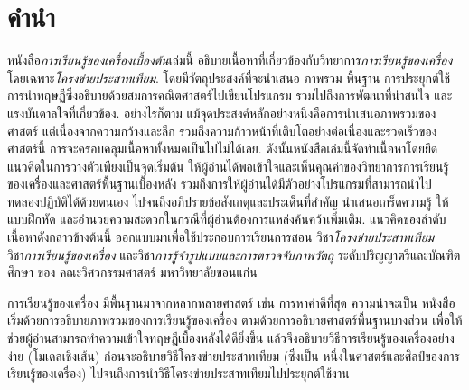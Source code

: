 \section*{คำนำ}

หนังสือ\textit{การเรียนรู้ของเครื่องเบื้องต้น}เล่มนี้ 
อธิบายเนื้อหาที่เกี่ยวข้องกับวิทยาการ\textit{การเรียนรู้ของเครื่อง} โดยเฉพาะ\textit{โครงข่ายประสาทเทียม}.
โดยมีวัตถุประสงค์ที่จะนำเสนอ ภาพรวม พื้นฐาน การประยุกต์ใช้  การนำทฤษฏีซึ่งอธิบายด้วยสมการคณิตศาสตร์ไปเขียนโปรแกรม
รวมไปถึงการพัฒนาที่น่าสนใจ และแรงบันดาลใจที่เกี่ยวข้อง.
อย่างไรก็ตาม แม้จุดประสงค์หลักอย่างหนึ่งคือการนำเสนอภาพรวมของศาสตร์
แต่เนื่องจากความกว้างและลึก
รวมถึงความก้าวหน้าที่เติบโตอย่างต่อเนื่องและรวดเร็วของศาสตร์นี้
การจะครอบคลุมเนื้อหาทั้งหมดเป็นไปไม่ได้เลย.
ดังนั้นหนังสือเล่มนี้จัดทำเนื้อหาโดยยึดแนวคิดในการวางตัวเพียงเป็นจุดเริ่มต้น
ให้ผู้อ่านได้พอเข้าใจและเห็นคุณค่าของวิทยาการการเรียนรู้ของเครื่องและศาสตร์พื้นฐานเบื้องหลัง
รวมถึงการให้ผู้อ่านได้มีตัวอย่างโปรแกรมที่สามารถนำไปทดลองปฏิบัติได้ด้วยตนเอง
ไปจนถึงอภิปรายข้อสังเกตุและประเด็นที่สำคัญ นำเสนอเกร็ดความรู้ ให้แบบฝึกหัด %
และอำนวยความสะดวกในกรณีที่ผู้อ่านต้องการแหล่งค้นคว้าเพิ่มเติม. 
แนวคิดของลำดับเนื้อหาดังกล่าวข้างต้นนี้ ออกแบบมาเพื่อใช้ประกอบการเรียนการสอน วิชา\textit{โครงข่ายประสาทเทียม} วิชา\textit{การเรียนรู้ของเครื่อง} และวิชา\textit{การรู้จำรูปแบบและการตรวจจับภาพวัตถุ} ระดับปริญญาตรีและบัณฑิตศึกษา ของ%
คณะวิศวกรรมศาสตร์ มหาวิทยาลัยขอนแก่น



การเรียนรู้ของเครื่อง มีพื้นฐานมาจากหลากหลายศาสตร์ เช่น การหาค่าดีที่สุด ความน่าจะเป็น
หนังสือเริ่มด้วยการอธิบายภาพรวมของการเรียนรู้ของเครื่อง 
ตามด้วยการอธิบายศาสตร์พื้นฐานบางส่วน เพื่อให้ช่วยผู้อ่านสามารถทำความเข้าใจทฤษฎีเบื้องหลังได้ดียิ่งขึ้น 
แล้วจึงอธิบายวิธีการเรียนรู้ของเครื่องอย่างง่าย (โมเดลเชิงเส้น) 
ก่อนจะอธิบายวิธีโครงข่ายประสาทเทียม (ซึ่งเป็น หนึ่งในศาสตร์และศิลป์ของการเรียนรู้ของเครื่อง) 
ไปจนถึงการนำวิธีโครงข่ายประสาทเทียมไปประยุกต์ใช้งาน

